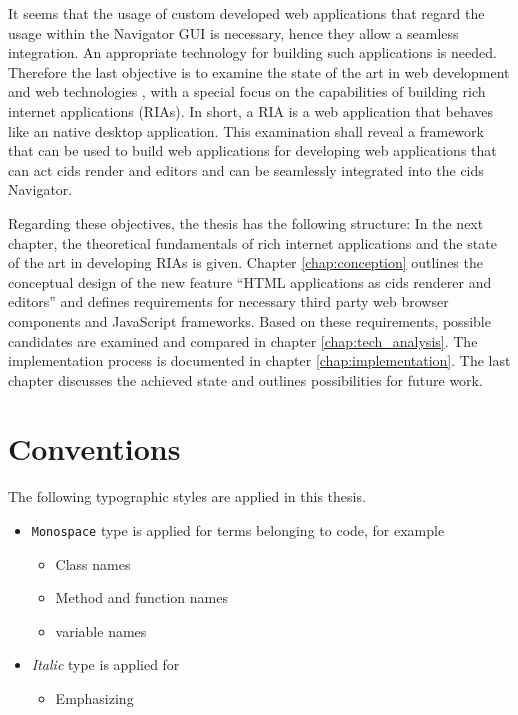 It seems that the usage of custom developed web applications that regard the usage within the Navigator GUI  is  necessary, hence they allow a seamless integration.
An appropriate technology for building such applications is needed.
Therefore the last objective is to examine the state of the art in web development and web technologies , with a special focus on the capabilities of building rich internet applications (RIAs).
In short, a RIA is a web application that behaves like an native desktop application.
This examination shall reveal a framework that can be used to build web applications for developing web applications that can act cids render and editors and can be seamlessly integrated into the cids Navigator.

Regarding these objectives, the thesis has the following structure: In the next chapter, the theoretical fundamentals of rich internet applications and the state of the art in developing RIAs is given.
Chapter \ref{chap:conception} outlines the conceptual design of the new feature \enquote{HTML applications as cids renderer and editors} and defines requirements for necessary third party web browser components and JavaScript frameworks.
Based on these requirements, possible candidates are examined and compared in chapter \ref{chap:tech_analysis}.
The  implementation process is documented in chapter \ref{chap:implementation}.
The last chapter discusses the achieved state and outlines possibilities for future work.
 
\section{Conventions}

The following typographic styles are applied in this thesis.

\begin{itemize}
\item \texttt{Monospace} type is applied for terms belonging to code, for example
	\begin{itemize}
		\item Class names
		\item Method and function names
		\item variable names
	\end{itemize}
\item \emph{Italic} type is applied for
	\begin{itemize}
		\item Emphasizing
	\end{itemize}
\end{itemize}
